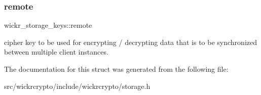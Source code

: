 \subsubsection{\texorpdfstring{remote}{remote}}
{\footnotesize\ttfamily wickr\+\_\+storage\+\_\+keys\+::remote}

cipher key to be used for encrypting / decrypting data that is to be synchronized between multiple client instances. 

The documentation for this struct was generated from the following file\+:\begin{DoxyCompactItemize}
\item 
src/wickrcrypto/include/wickrcrypto/storage.\+h\end{DoxyCompactItemize}
